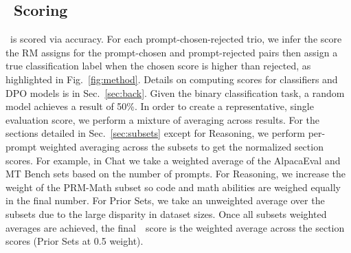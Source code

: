 \subsection{\name~Scoring}

\name~is scored via accuracy.
For each prompt-chosen-rejected trio, we infer the score the RM assigns for the prompt-chosen and prompt-rejected pairs
then assign a true classification label when the chosen score is higher than rejected, as highlighted in Fig.~\ref{fig:method}.
Details on computing scores for classifiers and DPO models is in Sec.~\ref{sec:back}.
Given the binary classification task, a random model achieves a result of 50\%.
In order to create a representative, single evaluation score, we perform a mixture of averaging across results.
For the sections detailed in Sec.~\ref{sec:subsets} except for Reasoning, we perform per-prompt weighted averaging across the subsets to get the normalized section scores.
For example, in Chat we take a weighted average of the AlpacaEval and MT Bench sets based on the number of prompts.
For Reasoning, we increase the weight of the PRM-Math subset so code and math abilities are weighed equally in the final number.
For Prior Sets, we take an unweighted average over the subsets due to the large disparity in dataset sizes.
Once all subsets weighted averages are achieved, the final~\name~score is the weighted average across the section scores (Prior Sets at 0.5 weight).
